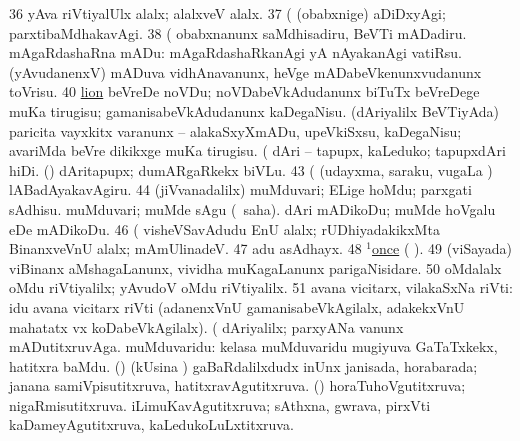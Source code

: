 \num{36}  yAva riVtiyalUlx alalx; alalxveV alalx. 
\num{37}  (  (obabxnige) aDiDxyAgi; parxtibaMdhakavAgi. 
\num{38}  (  obabxnanunx saMdhisadiru, BeVTi mADadiru. 
  mAgaRdashaRna mADu: 
\banum
{} mAgaRdashaRkanAgi yA nAyakanAgi vatiRsu. 
 (yAvudanenxV) mADuva vidhAnavanunx, heVge mADabeVkenunxvudanunx toVrisu. 
\eanum
\numie
\num{40} \hyperref{kandict_l.pdf}{L}{lion nuga(3)}{lion}  
  
\banum
{} beVreDe noVDu; noVDabeVkAdudanunx biTuTx beVreDege muKa tirugisu; gamanisabeVkAdudanunx kaDegaNisu. 
 (dAriyalilx BeVTiyAda) paricita vayxkitx \mo varanunx -- alakaSxyXmADu, upeVkiSxsu, kaDegaNisu; avariMda beVre dikikxge muKa tirugisu. 
\eanum
\numie
{}  (  
\banum
{} dAri -- tapupx, kaLeduko; tapupxdAri hiDi. 
 (\rUpa) dAritapupx; dumARgaRkekx biVLu. 
\eanum
\numie
\num{43}  (  (udayxma, saraku, \mo vugaLa \vi) lABadAyakavAgiru. 
\num{44}  (jiVvanadalilx) muMduvari; ELige hoMdu; parxgati sAdhisu. 
  
\banum
{} muMduvari; muMde sAgu (\rUpa\ saha). 
 dAri mADikoDu; muMde hoVgalu eDe mADikoDu. 
\eanum
\numie
\num{46}  (  visheVSavAdudu EnU alalx; rUDhiyadakikxMta BinanxveVnU alalx; mAmUlinadeV. 
\num{47}  adu asAdhayx. 
\num{48} \hyperref{kandict_o.pdf}{O}{once(1) pagu(3)}{$^1$once}  ( ). 
\num{49}  (viSayada) viBinanx aMshagaLanunx, vividha muKagaLanunx parigaNisidare. 
\num{50}  oMdalalx oMdu riVtiyalilx; yAvudoV oMdu riVtiyalilx. 
\num{51}  avana vicitarx, vilakaSxNa riVti:  idu avana vicitarx riVti (adanenxVnU gamanisabeVkAgilalx, adakekxVnU mahatatx vx koDabeVkAgilalx). 
  (  
\banum
{} dAriyalilx; parxyANa \mo vanunx mADutitxruvAga. 
 muMduvaridu: kelasa muMduvaridu mugiyuva GaTaTxkekx, hatitxra baMdu. 
 (\AmA) (kUsina \vi) gaBaRdalilxdudx inUnx janisada, horabarada; janana samiVpisutitxruva, hatitxravAgutitxruva. 
\eanum
\numie
{}  (\AmA) 
\banum
{} horaTuhoVgutitxruva; nigaRmisutitxruva. 
 iLimuKavAgutitxruva; sAthxna, gwrava, pirxVti kaDameyAgutitxruva, kaLedukoLuLxtitxruva. 
